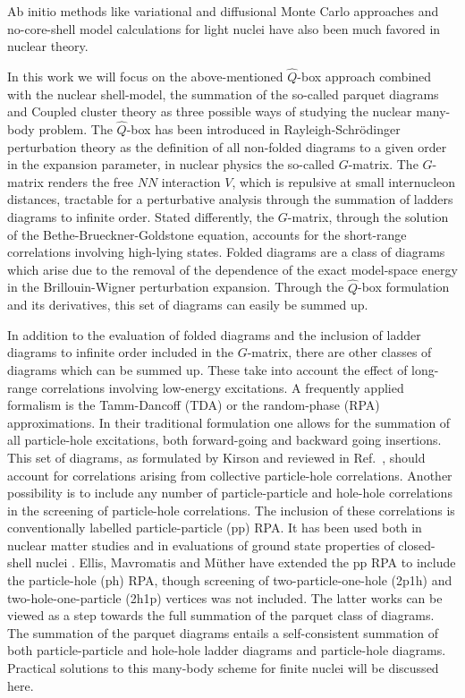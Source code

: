 \documentclass[twoside,12pt]{article}
\begin{document}
Ab initio methods like variational and diffusional Monte Carlo approaches 
\cite{vijay,ndrops97,bob1,bob2,bob3} and no-core-shell model calculations 
\cite{bruce1,bruce2,bruce3,bruce4} for light nuclei
have also been much favored
in nuclear theory.

In this work we will focus on the above-mentioned $\hat{Q}$-box approach combined with the 
nuclear shell-model,
the summation of the so-called parquet diagrams and Coupled cluster theory as three
possible ways of studying the nuclear many-body problem.
The
$\hat{Q}$-box has been introduced in Rayleigh-Schr\"odinger perturbation
theory as the definition of all non-folded diagrams to a given order in
the expansion parameter, in nuclear physics the so-called $G$-matrix.
The $G$-matrix renders the free $NN$  interaction $V$, which
is repulsive at small internucleon distances,  tractable
for a perturbative analysis through the summation of ladders diagrams
to infinite order. Stated differently, the $G$-matrix, through the
solution of the Bethe-Brueckner-Goldstone equation, accounts for the
short-range correlations involving high-lying states.
Folded diagrams are a class of diagrams which arise
due to the removal of the dependence of the exact model-space energy
in the Brillouin-Wigner perturbation expansion. Through the $\hat{Q}$-box
formulation and its derivatives, this set of diagrams can easily be summed
up.

In addition to the evaluation of folded diagrams and the inclusion
of ladder diagrams to infinite order included in the $G$-matrix, there
are other classes of diagrams which can be summed up.
These take into account
the effect of long-range correlations involving low-energy excitations.
A frequently applied formalism is
the Tamm-Dancoff (TDA) or the random-phase
(RPA) approximations. In their traditional formulation one allows
for the summation of all particle-hole excitations, both forward-going
and backward going insertions.
This set of diagrams, as formulated by Kirson \cite{kirson74} and reviewed
in Ref.\ \cite{eo77}, should account for correlations  arising
from collective particle-hole correlations. Another possibility
is to include any number of particle-particle and hole-hole
correlations in the screening of particle-hole correlations.
The inclusion of these correlations is conventionally labelled
particle-particle (pp) RPA. It has been used both in nuclear matter
studies \cite{angels88,rpd89,yhk86,syk87}
and in evaluations of ground state properties of closed-shell
nuclei \cite{hmtk87,emm91,hmm95}.
Ellis, Mavromatis and M\"uther \cite{emm91,hmm95} have
extended the pp RPA to include the particle-hole (ph) RPA, though
screening of two-particle-one-hole (2p1h) and two-hole-one-particle
(2h1p) vertices was not included.
The latter works can be viewed as a step towards the full summation of the
parquet class of diagrams.
The summation of the parquet diagrams entails a self-consistent
summation of both particle-particle and hole-hole ladder diagrams
and particle-hole diagrams. Practical solutions to this many-body
scheme for finite nuclei will be discussed here.
\end{document}
